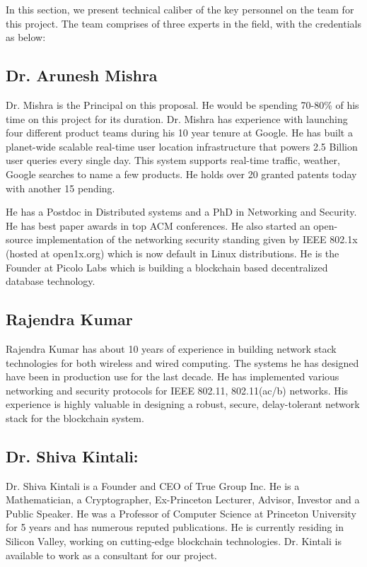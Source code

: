 \label{sec:pers}
In this section, we present technical caliber of the key personnel on the team for this project. The team comprises of
three experts in the field, with the credentials as below:

\subsection*{Dr. Arunesh Mishra}

Dr. Mishra is the Principal on this proposal. He would be spending 70-80\% of his time on this project for its duration.
Dr. Mishra has experience with launching four different product teams during his 10 year tenure at Google. He has built
a planet-wide scalable real-time user location infrastructure that powers 2.5 Billion user queries every single day.
This system supports real-time traffic, weather, Google searches to name a few products. He holds over 20 granted
patents today with another 15 pending. 

He has a Postdoc in Distributed systems and a PhD in Networking and Security. He has best paper awards in top ACM
conferences. He also started an open-source implementation of the networking security standing given by IEEE 802.1x
(hosted at open1x.org) which is now default in Linux distributions. He is the Founder at Picolo Labs which is building a
blockchain based decentralized database technology.

\subsection*{Rajendra Kumar}

Rajendra Kumar has about 10 years of experience in building network stack technologies for both wireless and wired
computing. The systems he has designed have been in production use for the last decade. He has implemented various
networking and security protocols for IEEE 802.11, 802.11(ac/b) networks. His experience is highly valuable in designing
a robust, secure, delay-tolerant network stack for the blockchain system.

\subsection*{Dr. Shiva Kintali:} 
Dr. Shiva Kintali is a Founder and CEO of True Group Inc. He is a Mathematician, a Cryptographer, Ex-Princeton Lecturer, Advisor,
Investor and a Public Speaker. He was a Professor of Computer Science at Princeton University for 5 years and has
numerous reputed publications. He is currently
residing in Silicon Valley, working on cutting-edge blockchain technologies. Dr. Kintali is available to work as a
consultant for our project.


